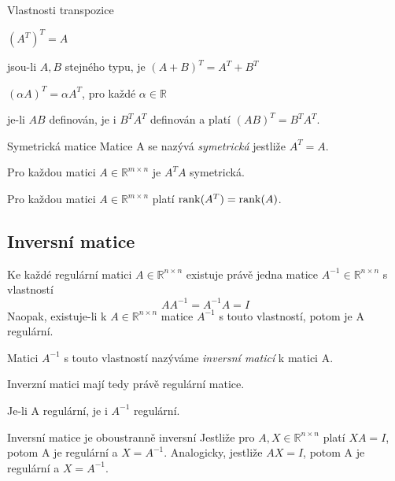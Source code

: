 \begin{lemmaN}{Vlastnosti transpozice}

\begin{penumerate}
	\item $(A^T)^T = A$
	\item jsou-li $A,B$ stejného typu, je $(A+B)^T = A^T + B^T$
	\item $(\alpha A)^T=\alpha A^T$, pro každé $\alpha \in \mathbb{R}$
	\item je-li $AB$ definován, je i $B^T A^T$ definován a platí $(AB)^T = B^T A^T$.
\end{penumerate}
\end{lemmaN}

\begin{definiceN}{Symetrická matice}
Matice A se nazývá \emph{symetrická} jestliže $A^T=A$.
\end{definiceN}

\begin{veta}
Pro každou matici $A \in \mathbb{R}^{m \times n}$ je $A^T A$ symetrická.
\end{veta}
\begin{veta}
Pro každou matici $A \in \mathbb{R}^{m \times n}$ platí $\mathrm{rank}(A^T)=\mathrm{rank}(A)$.
\end{veta}


\subsection{Inversní matice}

\begin{veta}
Ke každé regulární matici $A \in \mathbb{R}^{n \times n}$ existuje právě jedna matice $A^{-1} \in \mathbb{R}^{n \times n}$ s vlastností
$$A A^{-1} = A^{-1}A=I$$
Naopak, existuje-li k $A \in \mathbb{R}^{n \times n}$ matice $A^{-1}$ s touto vlastností, potom je A regulární.
\end{veta}

\begin{definice}
Matici $A^{-1}$ s touto vlastností nazýváme \emph{inversní maticí} k matici A.
\end{definice}

\begin{poznamka}
Inverzní matici mají tedy právě regulární matice.
\end{poznamka}
\begin{dusledek}
Je-li A regulární, je i $A^{-1}$ regulární.
\end{dusledek}

\begin{vetaN}{Inversní matice je oboustranně inversní}
Jestliže pro $A,X \in \mathbb{R}^{n \times n}$ platí $XA=I$, potom A je regulární a $X=A^{-1}$. Analogicky, jestliže $AX=I$, potom A je regulární a $X=A^{-1}$.
\end{vetaN}

